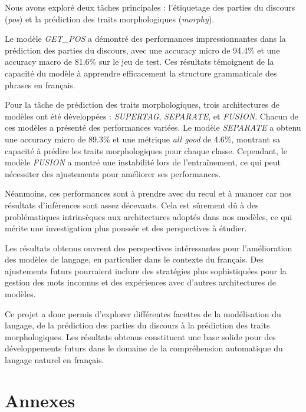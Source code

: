 \documentclass[a4paper]{article}
\begin{document}
Nous avons exploré deux tâches principales : l'étiquetage des parties du discours (\textit{pos}) et la prédiction des traits
morphologiques (\textit{morphy}). 

Le modèle \textit{GET\_POS} a démontré des performances impressionnantes dans la prédiction des parties du discours, avec une
accuracy micro de 94.4\% et une accuracy macro de 81.6\% sur le jeu de test. Ces résultats témoignent de la capacité du modèle
à apprendre efficacement la structure grammaticale des phrases en français.

Pour la tâche de prédiction des traits morphologiques, trois architectures de modèles ont été développées : \textit{SUPERTAG},
\textit{SEPARATE}, et \textit{FUSION}. Chacun de ces modèles a présenté des performances variées. Le modèle \textit{SEPARATE} a
obtenu une accuracy micro de 89.3\% et une métrique \textit{all good} de 4.6\%, montrant sa capacité à prédire les traits
morphologiques pour chaque classe. Cependant, le modèle \textit{FUSION} a montré une instabilité lors de l'entraînement, ce
qui peut nécessiter des ajustements pour améliorer ses performances.

Néanmoins, ces performances sont à prendre avec du recul et à nuancer car nos résultats d'inférences sont assez décevants. Cela est 
sûrement dû à des problématiques intrinsèques aux architectures adoptés dans nos modèles, ce qui mérite une investigation plus 
poussée et des perspectives à étudier. 

Les résultats obtenus ouvrent des perspectives intéressantes pour l'amélioration des modèles de langage, en particulier dans le
contexte du français. Des ajustements futurs pourraient inclure des stratégies plus sophistiquées pour la gestion des mots
inconnus et des expériences avec d'autres architectures de modèles.

Ce projet a donc permis d'explorer différentes facettes de la modélisation du langage, de la prédiction des parties du discours à
la prédiction des traits morphologiques. Les résultats obtenus constituent une base solide pour des développements futurs dans le
domaine de la compréhension automatique du langage naturel en français.


\section{Annexes}
\label{sec: Annexes}
\end{document}

